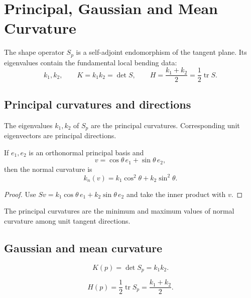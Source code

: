 \chapter{Principal, Gaussian and Mean Curvature}
\label{ch:vii17-principal-gaussian-mean-curvature}

The shape operator \(S_p\) is a self-adjoint endomorphism of the tangent plane. Its eigenvalues contain the fundamental local bending data:
\[
\boxed{k_1,k_2,\qquad K=k_1k_2=\det S,\qquad
H=\frac{k_1+k_2}{2}=\frac12\operatorname{tr}S.}
\]

\section{Principal curvatures and directions}

\begin{definition}\label{def:vii17-principal}
The eigenvalues \(k_1,k_2\) of \(S_p\) are the principal curvatures. Corresponding unit eigenvectors are principal directions.
\end{definition}

\begin{theorem}\label{thm:vii17-euler}
If \(e_1,e_2\) is an orthonormal principal basis and
\[
v=\cos\theta\,e_1+\sin\theta\,e_2,
\]
then the normal curvature is
\[
k_n(v)=k_1\cos^2\theta+k_2\sin^2\theta.
\]
\end{theorem}

\begin{proof}
Use \(Sv=k_1\cos\theta\,e_1+k_2\sin\theta\,e_2\) and take the inner product with \(v\).
\end{proof}

\begin{corollary}\label{cor:vii17-extremal}
The principal curvatures are the minimum and maximum values of normal curvature among unit tangent directions.
\end{corollary}

\section{Gaussian and mean curvature}

\begin{definition}\label{def:vii17-gaussian}
\[
K(p)=\det S_p=k_1k_2.
\]
\end{definition}

\begin{definition}\label{def:vii17-mean}
\[
H(p)=\frac12\operatorname{tr}S_p=\frac{k_1+k_2}{2}.
\]
\end{definition}

